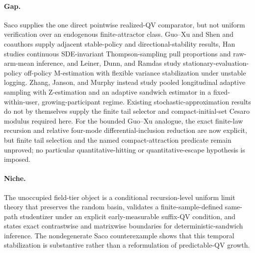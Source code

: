 \documentclass{article}
\begin{document}
\paragraph{Gap.} Saco supplies the one direct pointwise realized-QV comparator, but not uniform verification over an endogenous finite-attractor class. Guo--Xu and Shen and coauthors supply adjacent stable-policy and directional-stability results, Han studies continuous SDE-invariant Thompson-sampling pull proportions and raw-arm-mean inference, and Leiner, Dunn, and Ramdas study stationary-evaluation-policy off-policy M-estimation with flexible variance stabilization under unstable logging. Zhang, Janson, and Murphy instead study pooled longitudinal adaptive sampling with Z-estimation and an adaptive sandwich estimator in a fixed-within-user, growing-participant regime. Existing stochastic-approximation results do not by themselves supply the finite tail selector and compact-initial-set Cesaro modulus required here. For the bounded Guo--Xu analogue, the exact finite-law recursion and relative four-mode differential-inclusion reduction are now explicit, but finite tail selection and the named compact-attraction predicate remain unproved; no particular quantitative-hitting or quantitative-escape hypothesis is imposed.

\paragraph{Niche.} The unoccupied field-tier object is a conditional recursion-level uniform limit theory that preserves the random basin, validates a finite-sample-defined same-path studentizer under an explicit early-measurable suffix-QV condition, and states exact contrastwise and matrixwise boundaries for deterministic-sandwich inference. The nondegenerate Saco counterexample shows that this temporal stabilization is substantive rather than a reformulation of predictable-QV growth.
\end{document}
